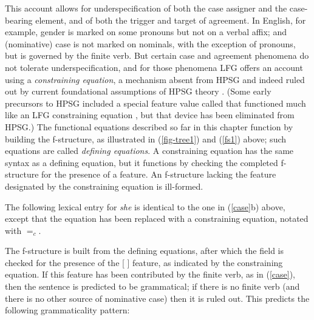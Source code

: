 This account allows for underspecification of both the case assigner and the case-bearing element,
and of both the trigger and target of agreement.   In  English, for example, gender is marked on
some pronouns but not on a verbal affix; and (nominative) case is not marked on   nominals, with the
exception of  pronouns, but is governed by the finite verb.  But certain case and agreement
phenomena do not tolerate underspecification, and for those phenomena LFG offers an account using a
\textit{constraining equation}, a mechanism absent from HPSG and indeed ruled out by current
foundational assumptions of HPSG theory .  (Some early precursors to HPSG included a special feature value called  that functioned much like an LFG constraining equation \citep[36--37]{Shieber86a}, but that device has been eliminated from HPSG.)  The functional equations described so far in this chapter function by building the f-structure, as illustrated in (\ref{fig-tree1}) and (\ref{fs1}) above; such equations are called \textit{defining equations}.  A constraining equation has the same syntax as a defining equation, but it functions by checking the completed f-structure for the presence of a feature.  An f-structure lacking the feature designated by the constraining equation is ill-formed.  

The following lexical entry for \textit{she} is identical to the one in (\ref{case}b) above, except that the  equation has been replaced with a constraining equation, notated with $=_c$.  

\ea
\label{constrain}
{\qquad{} }
\z
The f-structure is built from the defining equations, after which the \subj{} field is checked for the presence of the [ ] feature, as indicated by the constraining equation.  If this feature has been contributed by the finite verb, as in (\ref{case}), then the sentence is predicted to be grammatical; if there is no finite verb (and there is no other source of nominative case) then it is ruled out.  This predicts the following grammaticality pattern:

